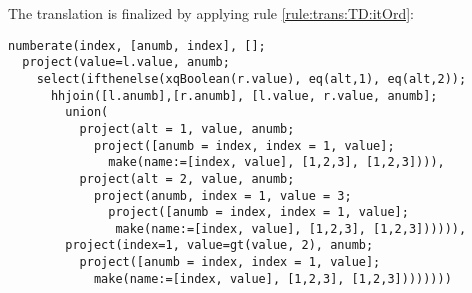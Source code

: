 The translation is finalized by applying rule \ref{rule:trans:TD:itOrd}:

\begin{Verbatim}
numberate(index, [anumb, index], [];
  project(value=l.value, anumb;
    select(ifthenelse(xqBoolean(r.value), eq(alt,1), eq(alt,2));
      hhjoin([l.anumb],[r.anumb], [l.value, r.value, anumb];
        union(
          project(alt = 1, value, anumb;
            project([anumb = index, index = 1, value];
              make(name:=[index, value], [1,2,3], [1,2,3]))),
          project(alt = 2, value, anumb;
            project(anumb, index = 1, value = 3;
              project([anumb = index, index = 1, value];
               make(name:=[index, value], [1,2,3], [1,2,3]))))),
        project(index=1, value=gt(value, 2), anumb;
          project([anumb = index, index = 1, value];
            make(name:=[index, value], [1,2,3], [1,2,3])))))))
\end{Verbatim}